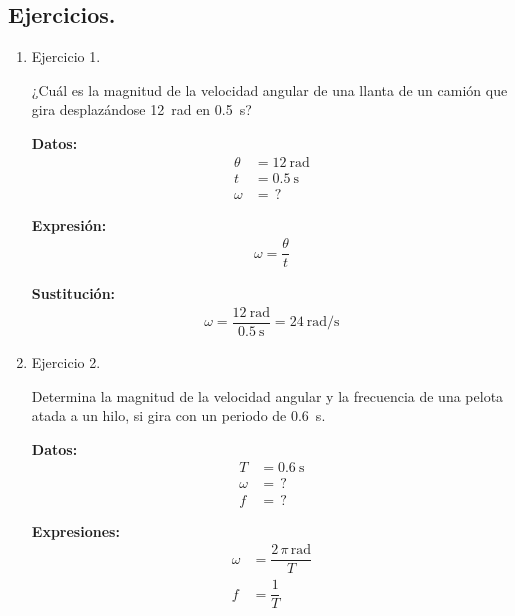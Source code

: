 \documentclass[12pt]{article}
\begin{document}
\subsection{Ejercicios.}

\begin{enumerate}
\item Ejercicio 1.

¿Cuál es la magnitud de la velocidad angular de una llanta de un camión que gira desplazándose \SI{12}{\radian} en \SI{0.5}{\second}?

\vspace*{0.5cm}
\begin{minipage}[t]{0.4\linewidth}
\textbf{Datos:}
\begin{align*}
\theta &= \SI{12}{\radian} \\
t &= \SI{0.5}{\second} \\
\omega &= \, ?
\end{align*}
\end{minipage}
\begin{minipage}[t]{0.4\linewidth}
\textbf{Expresión:}
\begin{align*}
\omega = \dfrac{\theta}{t}
\end{align*}
\end{minipage}

\textbf{Sustitución:}
\begin{align*}
\omega = \dfrac{\SI{12}{\radian}}{\SI{0.5}{\second}} = \SI[per-mode=fraction]{24}{\radian\per\second}
\end{align*}
\item Ejercicio 2.

Determina la magnitud de la velocidad angular y la frecuencia de una pelota atada a un hilo, si gira con un periodo de \SI{0.6}{\second}.

\vspace*{0.5cm}
\begin{minipage}[t]{0.4\linewidth}
\textbf{Datos:}
\begin{align*}
T &= \SI{0.6}{\second} \\
\omega &= \, ? \\
f &= \, ?
\end{align*}
\end{minipage}
\begin{minipage}[t]{0.4\linewidth}
\textbf{Expresiones:}
\begin{align*}
\omega &= \dfrac{2 \, \pi \, \unit{\radian}}{T} \\[0.5em]
f &= \dfrac{1}{T}
\end{align*}
\end{minipage}


\end{enumerate}
\end{document}
